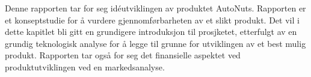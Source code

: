 Denne rapporten tar for seg idéutviklingen av produktet AutoNuts. Rapporten er 
et konseptstudie for å vurdere gjennomførbarheten av et slikt produkt. Det vil 
i dette kapitlet bli gitt en grundigere introduksjon til prosjketet, etterfulgt 
av en grundig teknologisk analyse for å legge til grunne for utviklingen 
av et best mulig produkt. Rapporten tar også for seg det finansielle aspektet ved 
produktutviklingen ved en markedsanalyse.